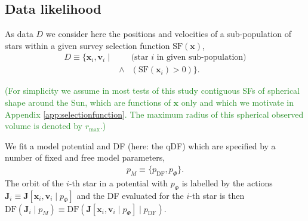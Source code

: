 \documentclass[iop,revtex4]{emulateapj}
\newcommand{\vect}[1]{\boldsymbol{#1}}
\newcommand{\pmodel}{\ensuremath{p_M}}
\newcommand{\NEW}[1]{\textcolor{ForestGreen}{#1}}
\begin{document}
\subsection{Data likelihood} %

As data $D$ we consider here the positions and velocities of a sub-population of stars within a given survey selection function $\text{SF}(\vect{x})$,
\begin{eqnarray*}
D  \equiv \{ \vect{x}_i,\vect{v}_i \mid && \text{(star $i$ in given sub-population)}\nonumber\\
&\wedge& (\text{SF}(\vect{x}_i) > 0) \}.
\end{eqnarray*}

\NEW{(For simplicity we assume in most tests of this study contiguous SFs of spherical shape around the Sun, which are functions of $\vect{x}$ only and which we motivate in Appendix \ref{app:selectionfunction}. The maximum radius of this spherical observed volume is denoted by $r_\text{max}$.)}

We fit a model potential and DF (here: the qDF) which are specified by a number of fixed and free model parameters,
\begin{eqnarray*}
\pmodel \equiv \{ p_\text{DF} , p_\Phi \}.
\end{eqnarray*}
The orbit of the $i$-th star in a potential with $p_\Phi$ is labelled by the actions $\vect{J}_i \equiv \vect{J}[\vect{x}_i,\vect{v}_i\mid p_{\Phi}]$ and the DF evaluated for the $i$-th star is then $\text{DF}(\vect{J}_i \mid \pmodel) \equiv \text{DF}(\vect{J}[\vect{x}_i,\vect{v}_i\mid p_{\Phi}] \mid p_\text{DF})$.
\end{document}
